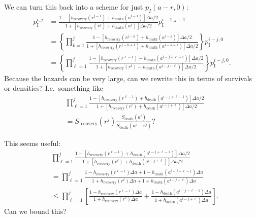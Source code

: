 \documentclass[12pt]{article}
\begin{document}
We can turn this back into a scheme for just $p_I(a - r, 0)$:
\begin{equation}
  \begin{split}
    p_{\text{I}}^{i, j}
    &= \frac{1 - \left[h_{\text{recovery}}(r^{j - 1})
        + h_{\text{death}}(a^{i - 1})\right] \Delta a / 2}
    {1 + \left[h_{\text{recovery}}(r^j)
        + h_{\text{death}}(a^i)\right] \Delta a / 2}
    p_{\text{I}}^{i - 1, j - 1}
    \\
    &= \left\{
      \prod_{k = 1}^j
      \frac{1 - \left[h_{\text{recovery}}(r^{j - k})
          + h_{\text{death}}(a^{i - k})\right] \Delta a / 2}
      {1 + \left[h_{\text{recovery}}(r^{j - k + 1})
          + h_{\text{death}}(a^{i - k + 1})\right] \Delta a / 2}
    \right\}
    p_{\text{I}}^{i - j, 0}
    \\
    &= \left\{
      \prod_{\ell = 1}^j
      \frac{1 - \left[h_{\text{recovery}}(r^{\ell - 1})
          + h_{\text{death}}(a^{i - j + \ell - 1})\right] \Delta a / 2}
      {1 + \left[h_{\text{recovery}}(r^{\ell})
          + h_{\text{death}}(a^{i - j + \ell})\right] \Delta a / 2}
    \right\}
    p_{\text{I}}^{i - j, 0}.
  \end{split}
\end{equation}
Because the hazards can be very large, can we rewrite this in terms of
survivals or densities? I.e.~something like
\begin{equation}
  \begin{split}
    &\prod_{\ell = 1}^j
    \frac{1 - \left[h_{\text{recovery}}(r^{\ell - 1})
        + h_{\text{death}}(a^{i - j + \ell - 1})\right] \Delta a / 2}
    {1 + \left[h_{\text{recovery}}(r^{\ell})
        + h_{\text{death}}(a^{i - j + \ell})\right] \Delta a / 2}
    \\
    &= S_{\text{recovery}}(r^j)
    \frac{S_{\text{death}}(a^i)}{S_{\text{death}}(a^i - r^j)}?
  \end{split}
\end{equation}

This seems useful:
\begin{equation}
  \begin{split}
    &\prod_{\ell = 1}^j
    \frac{1 - \left[h_{\text{recovery}}(r^{\ell - 1})
        + h_{\text{death}}(a^{i - j + \ell - 1})\right] \Delta a / 2}
    {1 + \left[h_{\text{recovery}}(r^{\ell})
        + h_{\text{death}}(a^{i - j + \ell})\right] \Delta a / 2}
    \\
    &= \prod_{\ell = 1}^j
    \frac{1 - h_{\text{recovery}}(r^{\ell - 1}) \Delta a
      + 1 - h_{\text{death}}(a^{i - j + \ell - 1}) \Delta a}
    {1 + h_{\text{recovery}}(r^{\ell}) \Delta a
      + 1 + h_{\text{death}}(a^{i - j + \ell}) \Delta a}
    \\
    &\leq \prod_{\ell = 1}^j
    \left[
      \frac{1 - h_{\text{recovery}}(r^{\ell - 1}) \Delta a}
      {1 + h_{\text{recovery}}(r^{\ell}) \Delta a}
      + \frac{1 - h_{\text{death}}(a^{i - j + \ell - 1}) \Delta a}
      {1 + h_{\text{death}}(a^{i - j + \ell}) \Delta a}
    \right].
  \end{split}
\end{equation}
Can we bound this?
\end{document}
